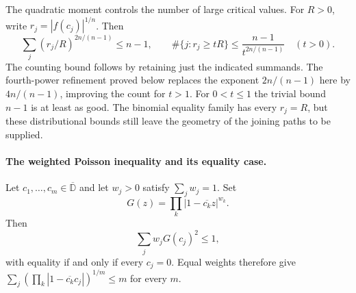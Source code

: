 The quadratic moment controls the number of large critical values.
For $R>0$, write $r_j=|f(c_j)|^{1/n}$. Then
\[
 \sum_j(r_j/R)^{2n/(n-1)}\le n-1,\qquad
 \#\{j:r_j\ge tR\}\le\frac{n-1}{t^{2n/(n-1)}}\quad(t>0).
\]
The counting bound follows by retaining just the indicated summands.
The fourth-power refinement proved below replaces the exponent
$2n/(n-1)$ here by $4n/(n-1)$, improving the count for $t>1$.
For $0<t\le1$ the trivial bound $n-1$ is at least as good.
The binomial equality family has every $r_j=R$, but these distributional
bounds still leave the geometry of the joining paths to be supplied.

\paragraph{The weighted Poisson inequality and its equality case.}
\hypertarget{weighted-poisson-proof}{}
\begin{theorem}
\label{res:fp-weighted-all-degree}
Let $c_1,\ldots,c_m\in\overline{\mathbb D}$ and let $w_j>0$ satisfy
$\sum_j w_j=1$.  Set
\[
 G(z)=\prod_k |1-\overline{c_k}z|^{w_k}.
\]
Then
\[
 \sum_j w_j G(c_j)^2\le 1,
\]
with equality if and only if every $c_j=0$.  Equal weights therefore give
$\sum_j(\prod_k|1-\overline{c_k}c_j|)^{1/m}\le m$ for every $m$.
\end{theorem}

